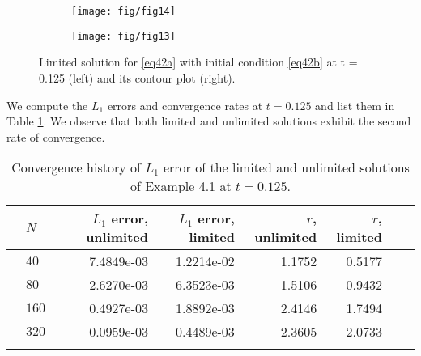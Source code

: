 \documentclass[reqno,a4paper,12pt]{amsart}
\begin{document}
\begin{figure}[htb!]
\centering
     \begin{subfigure}[b]{0.45\textwidth}
         \centering
         \texttt{[image: fig/fig14]}
     \end{subfigure} \quad
     \begin{subfigure}[b]{0.45\textwidth}
         \centering
         \texttt{[image: fig/fig13]}
     \end{subfigure}
     \hfill
    
        \caption{Limited solution for \eqref{eq42a} with initial condition \eqref{eq42b} at t = 0.125 (left) and its contour plot (right).}
        \label{fig:2}
\end{figure}

We compute the $L_1$ errors and convergence rates at $t = 0.125$ and list them in Table \ref{table:convergence}. We observe that both limited and unlimited solutions exhibit the second rate of convergence. 

\begin{table}[htb!]\centering
\begin{tabular}{@{}llrrrrrr@{}}\toprule
& $N$ & $L_1$ error, unlimited & $L_1$ error, limited & $r$, unlimited& $r$, limited \\ \midrule
& $40$ & 7.4849e-03 & 1.2214e-02 & 1.1752 & 0.5177 & \\
& $80$ & 2.6270e-03 & 6.3523e-03 & 1.5106 & 0.9432 \\
& $160$ & 0.4927e-03 & 1.8892e-03 & 2.4146 & 1.7494 & \\
& $320$ & 0.0959e-03 & 0.4489e-03 & 2.3605 & 2.0733 & \\
\bottomrule\\
\end{tabular}
\caption{Convergence history of $L_1$ error of the limited and unlimited solutions of Example 4.1 at $t = 0.125$.}
\label{table:convergence}
\end{table}
\end{document}
